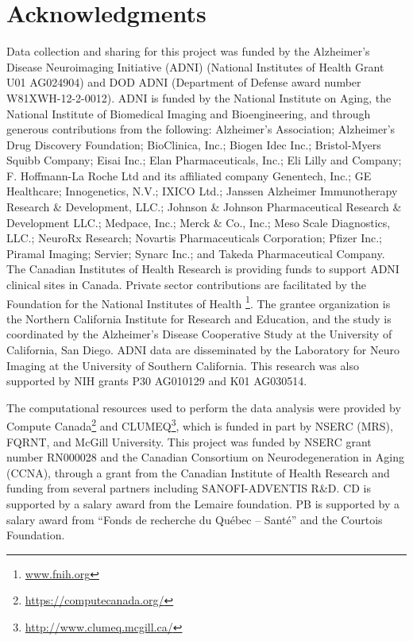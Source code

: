 \documentclass[authoryear]{elsarticle}
\begin{document}
\section{Acknowledgments}
Data collection and sharing for this project was funded by the Alzheimer's Disease Neuroimaging Initiative (ADNI) (National Institutes of Health Grant U01 AG024904) and DOD ADNI (Department of Defense award number W81XWH-12-2-0012). ADNI is funded by the National Institute on Aging, the National Institute of Biomedical Imaging and Bioengineering, and through generous contributions from the following: Alzheimer's Association; Alzheimer's Drug Discovery Foundation; BioClinica, Inc.; Biogen Idec Inc.; Bristol-Myers Squibb Company; Eisai Inc.; Elan Pharmaceuticals, Inc.; Eli Lilly and Company; F. Hoffmann-La Roche Ltd and its affiliated company Genentech, Inc.; GE Healthcare; Innogenetics, N.V.; IXICO Ltd.; Janssen Alzheimer Immunotherapy Research \& Development, LLC.; Johnson \& Johnson Pharmaceutical Research \& Development LLC.; Medpace, Inc.; Merck \& Co., Inc.; Meso Scale Diagnostics, LLC.; NeuroRx Research; Novartis Pharmaceuticals Corporation; Pfizer Inc.; Piramal Imaging; Servier; Synarc Inc.; and Takeda Pharmaceutical Company. The Canadian Institutes of Health Research is providing funds to support ADNI clinical sites in Canada. Private sector contributions are facilitated by the Foundation for the National Institutes of Health \footnote{\url{www.fnih.org}}. The grantee organization is the Northern California Institute for Research and Education, and the study is coordinated by the Alzheimer's Disease Cooperative Study at the University of California, San Diego. ADNI data are disseminated by the Laboratory for Neuro Imaging at the University of Southern California. This research was also supported by NIH grants P30 AG010129 and K01 AG030514.

The computational resources used to perform the data analysis were provided by Compute Canada\footnote{\url{https://computecanada.org/}} and CLUMEQ\footnote{\url{http://www.clumeq.mcgill.ca/}}, which is funded in part by NSERC (MRS), FQRNT, and McGill University. This project was funded by NSERC grant number RN000028 and the Canadian
Consortium on Neurodegeneration in Aging (CCNA), through a grant from
the Canadian Institute of Health Research and funding from several partners including SANOFI-ADVENTIS R\&D. CD is supported by a salary award from the Lemaire foundation. PB is supported by a salary award from ``Fonds de recherche du Qu\'ebec -- Sant\'e'' and the Courtois Foundation.
\end{document}

